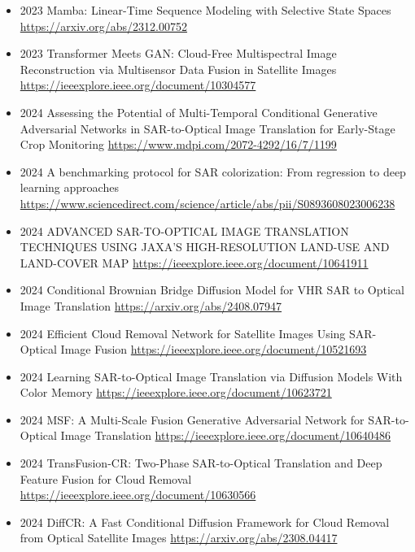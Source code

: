 \begin{itemize}
    \item 2023 Mamba: Linear-Time Sequence Modeling with Selective State Spaces
    \url{https://arxiv.org/abs/2312.00752}

    \item 2023 Transformer Meets GAN: Cloud-Free Multispectral Image Reconstruction via Multisensor Data Fusion in Satellite Images
    \url{https://ieeexplore.ieee.org/document/10304577}
    
    \item 2024 Assessing the Potential of Multi-Temporal Conditional Generative Adversarial Networks in SAR-to-Optical Image Translation for Early-Stage Crop Monitoring
    \url{https://www.mdpi.com/2072-4292/16/7/1199}
    
    \item 2024 A benchmarking protocol for SAR colorization: From regression to deep learning approaches
    \url{https://www.sciencedirect.com/science/article/abs/pii/S0893608023006238}
    
    \item 2024 ADVANCED SAR-TO-OPTICAL IMAGE TRANSLATION TECHNIQUES USING JAXA'S HIGH-RESOLUTION LAND-USE AND LAND-COVER MAP 
    \url{https://ieeexplore.ieee.org/document/10641911}

    \item 2024 Conditional Brownian Bridge Diffusion Model for VHR SAR to Optical Image Translation 
    \url{https://arxiv.org/abs/2408.07947}

    \item 2024 Efficient Cloud Removal Network for Satellite Images Using SAR-Optical Image Fusion 
    \url{https://ieeexplore.ieee.org/document/10521693}

    \item 2024 Learning SAR-to-Optical Image Translation via Diffusion Models With Color Memory 
    \url{https://ieeexplore.ieee.org/document/10623721}

    \item 2024 MSF: A Multi-Scale Fusion Generative Adversarial Network for SAR-to-Optical Image Translation 
    \url{https://ieeexplore.ieee.org/document/10640486}

    \item 2024 TransFusion-CR: Two-Phase SAR-to-Optical Translation and Deep Feature Fusion for Cloud Removal 
    \url{https://ieeexplore.ieee.org/document/10630566}

    \item 2024 DiffCR: A Fast Conditional Diffusion Framework for Cloud Removal from Optical Satellite Images
    \url{https://arxiv.org/abs/2308.04417}


\end{itemize}
